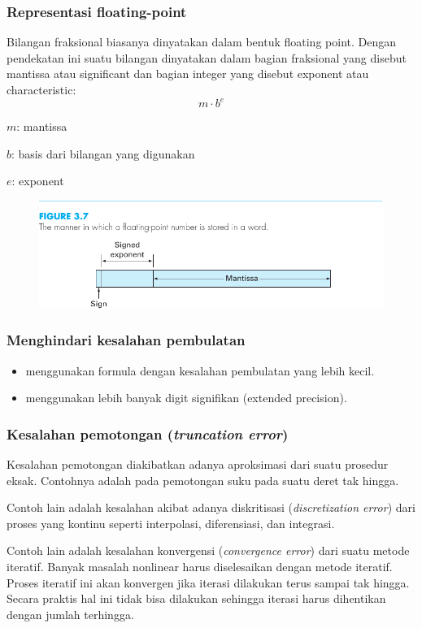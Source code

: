 \documentclass[9pt]{beamer}
\begin{document}
\begin{frame}
\frametitle{Representasi floating-point}

Bilangan fraksional biasanya dinyatakan dalam bentuk floating point. Dengan pendekatan ini
suatu bilangan dinyatakan dalam bagian fraksional yang disebut mantissa atau significant
dan bagian integer yang disebut exponent atau characteristic:
\begin{equation}
m \cdot b^{e}
\end{equation}

$m$: mantissa

$b$: basis dari bilangan yang digunakan

$e$: exponent

\begin{figure}[H]
{\center
\includegraphics[scale=1.0]{images/Chapra_3_7.pdf}
\par}
\end{figure}

\end{frame}


\begin{frame}
\frametitle{Menghindari kesalahan pembulatan}

\begin{itemize}
\item menggunakan formula dengan kesalahan pembulatan yang lebih kecil.
\item menggunakan lebih banyak digit signifikan (extended precision).
\end{itemize}

\end{frame}


\begin{frame}
\frametitle{Kesalahan pemotongan (\textit{truncation error})}

Kesalahan pemotongan diakibatkan adanya aproksimasi dari suatu prosedur eksak.
Contohnya adalah pada pemotongan suku pada suatu deret tak hingga.

Contoh lain adalah kesalahan akibat adanya diskritisasi (\textit{discretization error})
dari proses yang kontinu seperti interpolasi, diferensiasi, dan integrasi.

Contoh lain adalah kesalahan konvergensi (\textit{convergence error}) dari suatu
metode iteratif. Banyak masalah nonlinear harus diselesaikan dengan metode iteratif.
Proses iteratif ini akan konvergen jika iterasi dilakukan terus sampai tak hingga.
Secara praktis hal ini tidak bisa dilakukan sehingga iterasi harus dihentikan dengan
jumlah terhingga.

\end{frame}
\end{document}
